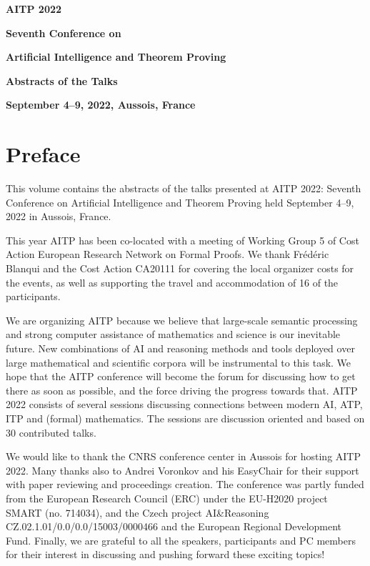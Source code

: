 \documentclass[a4paper]{llncs}
\begin{document}
\vspace*{2cm}
\centerline{\huge \bf AITP 2022}\vspace{3cm}
\centerline{\Large \bf Seventh Conference on}\vspace{3mm}
\centerline{\Large \bf Artificial Intelligence and Theorem Proving}\vspace{5cm}
\centerline{\Large \bf Abstracts of the Talks}\vspace{3cm}
\centerline{\large \bf September 4--9, 2022, Aussois, France}
\clearpage
\section*{Preface}

This volume contains the abstracts of the talks presented at AITP
2022: Seventh Conference on Artificial Intelligence and Theorem
Proving held September 4--9, 2022 in Aussois, France.

This year AITP has been co-located with a meeting of Working Group 5 of
Cost Action European Research Network on Formal Proofs. We thank
Frédéric Blanqui and the Cost Action CA20111 for covering the local organizer
costs for the events, as well as supporting the travel and accommodation
of 16 of the participants.

We are organizing AITP because we believe that large-scale semantic
processing and strong computer assistance of mathematics and science
is our inevitable future. New combinations of AI and reasoning methods
and tools deployed over large mathematical and scientific corpora will
be instrumental to this task. We hope that the AITP conference will
become the forum for discussing how to get there as soon as possible,
and the force driving the progress towards that.  AITP 2022 consists
of several sessions discussing connections between modern AI, ATP, ITP
and (formal) mathematics. The sessions are discussion oriented and
based on 30 contributed talks.

We would like to thank the CNRS conference center in Aussois for hosting AITP 2022.
Many thanks also to Andrei Voronkov and his EasyChair for their support with paper reviewing and
proceedings creation.  The conference was partly funded from the
European Research Council (ERC) under the EU-H2020 project SMART
(no. 714034), and the Czech project
AI\&Reasoning CZ.02.1.01/0.0/0.0/15003/0000466 and the European
Regional Development Fund.  Finally, we are grateful to all the
speakers, participants and PC members for their interest in discussing
and pushing forward these exciting topics!
\end{document}

